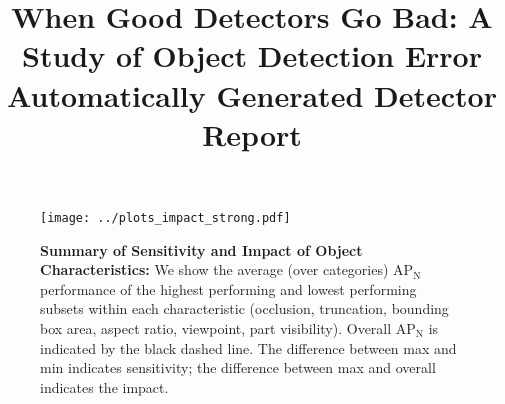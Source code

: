 \documentclass[11pt,letterpaper]{article}
\newcommand{\mrm}[1]{\mathrm{#1}}
\def\apn{AP$\mrm{_N}$ }
\begin{document}
\title{When Good Detectors Go Bad: A Study of Object Detection Error\\
Automatically Generated Detector Report}

\maketitle

 

 

\begin{figure}[htp]
\begin{center}
\texttt{[image: ../plots\_impact\_strong.pdf]} \\
\end{center}
\caption{
\textbf{Summary of Sensitivity and Impact of Object Characteristics: } We show the average (over categories) \apn performance of the highest performing and lowest performing subsets within each characteristic (occlusion, truncation, bounding box area, aspect ratio, viewpoint, part visibility).  Overall \apn is indicated by the black dashed line.  The difference between max and min indicates sensitivity; the difference between max and overall indicates the impact.
}
\end{figure}
\end{document}

